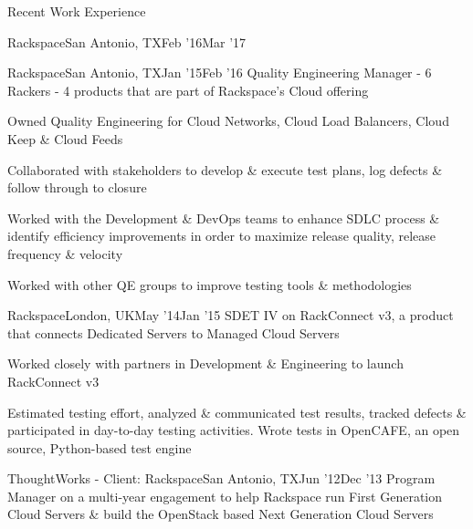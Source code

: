 \documentclass{resume} %
\begin{document}
\begin{rSection}{Recent Work Experience}
\begin{rSubsection}{Rackspace}{San Antonio, TX}{Feb '16}{Mar '17}
\end{rSubsection}
    
\begin{rSubsection}{Rackspace}{San Antonio, TX}{Jan '15}{Feb '16}
{Quality Engineering Manager - 6 Rackers - 4 products that are part of Rackspace's Cloud offering}

\item Owned Quality Engineering for Cloud Networks, Cloud Load Balancers, Cloud Keep \& Cloud Feeds
\item Collaborated with stakeholders to develop \& execute test plans, log defects \& follow through to closure
\item Worked with the Development \& DevOps teams to enhance SDLC process \& identify efficiency improvements in order to maximize release quality, release frequency \& velocity
\item Worked with other QE groups to improve testing tools \& methodologies

\end{rSubsection}


\begin{rSubsection}{Rackspace}{London, UK}{May '14}{Jan '15}
{SDET IV on RackConnect v3, a product that connects Dedicated Servers to Managed Cloud Servers}

\item Worked closely with partners in Development \& Engineering to launch RackConnect v3
\item Estimated testing effort, analyzed \& communicated test results, tracked defects \& participated in day-to-day testing activities. Wrote tests in OpenCAFE, an open source, Python-based test engine

\end{rSubsection}





\begin{rSubsection}{ThoughtWorks - Client: Rackspace}{San Antonio, TX}{Jun '12}{Dec '13}
{Program Manager on a multi-year engagement to help Rackspace run
  First Generation Cloud Servers \& build the OpenStack based Next
  Generation Cloud Servers}


\end{rSubsection}
\end{rSection}
\end{document}
